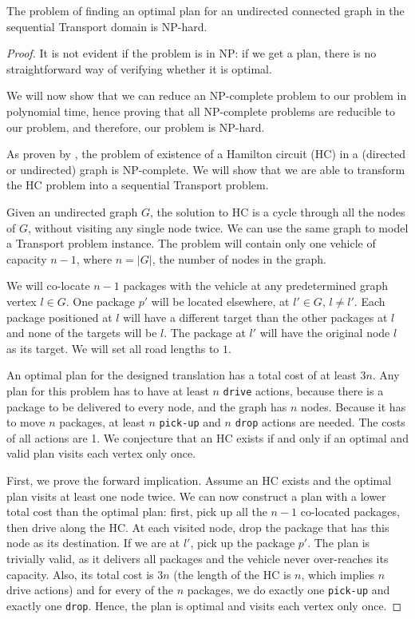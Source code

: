 \begin{thm}
The problem of finding an optimal plan for an undirected connected graph in the sequential
Transport domain is NP-hard. 
\end{thm}
\begin{proof}
It is not evident if the problem is in NP: if we get a plan, there is no straightforward
way of verifying whether it is optimal.

We will now show that we can reduce an NP-complete problem to our problem in polynomial time,
hence proving that all NP-complete problems are reducible to our problem,
and therefore, our problem is NP-hard.

As proven by \citet{Karp1972}, the problem of existence of a Hamilton circuit (HC) in a (directed or undirected) graph is NP-complete. We will show that we are able to transform the HC problem into a sequential Transport problem.

Given an undirected graph $G$, the solution to HC is a cycle through all the nodes of $G$,
without visiting any single node twice.
We can use the same graph to model a Transport problem instance.
The problem will contain only one vehicle of capacity $n-1$,
where $n = |G|$, the number of nodes in the graph.

We will co-locate $n-1$ packages with the vehicle at any predetermined graph vertex $l \in G$.
One package $p'$ will be located elsewhere, at $l' \in G,\, l \neq l'$.
Each package positioned at $l$ will have a different target than the other packages at $l$
and none of the targets will be $l$. The package at $l'$ will have the original node $l$
as its target. We will set all road lengths to $1$. 

An optimal plan for the designed translation has a total cost of at least $3n$.
Any plan for this problem has to have at least $n$ \verb+drive+ actions, because
there is a package to be delivered to every node, and the graph has $n$ nodes.
Because it has to move $n$ packages, at least $n$ \verb+pick-up+ and $n$ \verb+drop+
actions are needed. The costs of all actions are 1.
We conjecture that an HC exists if and only if an optimal and valid plan visits each vertex only once.

First, we prove the forward implication. Assume an HC exists and the optimal plan visits at least one node twice. We can now construct a plan with a lower total cost than the optimal plan: first, pick up all the $n-1$ co-located packages, then drive along the HC. At each
visited node, drop the package that has this node as its destination. If we are at $l'$,
pick up the package $p'$. The plan is trivially valid, as it delivers all packages
and the vehicle never over-reaches its capacity. Also, its total cost is $3n$
(the length of the HC is $n$, which implies $n$ drive actions) and for every of the $n$ packages, we do exactly one \verb+pick-up+ and exactly one \verb+drop+. Hence, the plan
is optimal and visits each vertex only once.


\end{proof}

